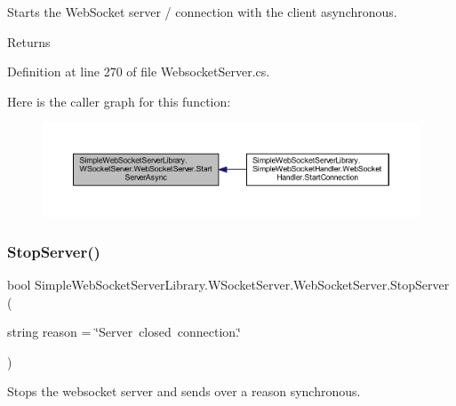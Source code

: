 Starts the Web\+Socket server / connection with the client asynchronous. 

\begin{DoxyReturn}{Returns}

\end{DoxyReturn}


Definition at line 270 of file Websocket\+Server.\+cs.

Here is the caller graph for this function\+:
\nopagebreak
\begin{figure}[H]
\begin{center}
\leavevmode
\includegraphics[width=350pt]{class_simple_web_socket_server_library_1_1_w_socket_server_1_1_web_socket_server_ade70132fb8fb9150d8366eec2b9831e4_icgraph}
\end{center}
\end{figure}
\mbox{\label{class_simple_web_socket_server_library_1_1_w_socket_server_1_1_web_socket_server_a20756f37e37a07b424764d14cfdd9f6b}} 
\subsubsection{\texorpdfstring{Stop\+Server()}{StopServer()}}
{\footnotesize\ttfamily bool Simple\+Web\+Socket\+Server\+Library.\+W\+Socket\+Server.\+Web\+Socket\+Server.\+Stop\+Server (\begin{DoxyParamCaption}\item[{string}]{reason = {\ttfamily \char`\"{}Server~closed~connection.\char`\"{}} }\end{DoxyParamCaption})}



Stops the websocket server and sends over a reason synchronous. 


